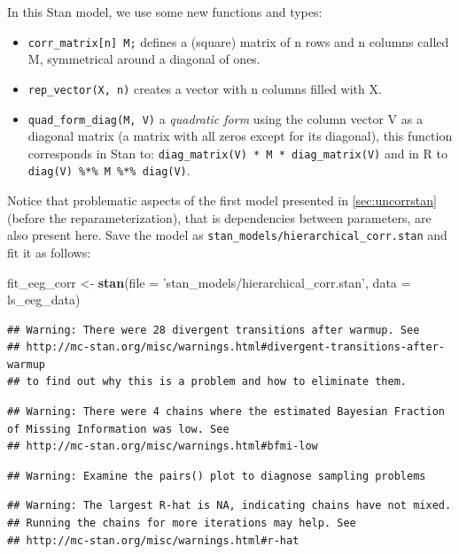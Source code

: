 \documentclass[12pt,]{krantz}
\newenvironment{Shaded}{\begin{snugshade}}{\end{snugshade}}
\newcommand{\DataTypeTok}[1]{\textcolor[rgb]{0.13,0.29,0.53}{#1}}
\newcommand{\KeywordTok}[1]{\textcolor[rgb]{0.13,0.29,0.53}{\textbf{#1}}}
\newcommand{\NormalTok}[1]{#1}
\newcommand{\StringTok}[1]{\textcolor[rgb]{0.31,0.60,0.02}{#1}}
\providecommand{\tightlist}{%
  \setlength{\itemsep}{0pt}\setlength{\parskip}{0pt}}
\theoremstyle{definition}
\theoremstyle{definition}
\theoremstyle{definition}
\theoremstyle{remark}
\begin{document}
In this Stan model, we use some new functions and types:

\begin{itemize}
\tightlist
\item
  \texttt{corr\_matrix{[}n{]}\ M;} defines a (square) matrix of n rows and n columns called M, symmetrical around a diagonal of ones.
\item
  \texttt{rep\_vector(X,\ n)} creates a vector with n columns filled with X.
\item
  \texttt{quad\_form\_diag(M,\ V)} a \emph{quadratic form} using the column vector V as a diagonal matrix (a matrix with all zeros except for its diagonal), this function corresponds in Stan to: \texttt{diag\_matrix(V)\ *\ M\ *\ diag\_matrix(V)} and in R to \texttt{diag(V)\ \%*\%\ M\ \%*\%\ diag(V)}.
\end{itemize}

Notice that problematic aspects of the first model presented in \ref{sec:uncorrstan} (before the reparameterization), that is dependencies between parameters, are also present here. Save the model as \texttt{stan\_models/hierarchical\_corr.stan} and fit it as follows:

\begin{Shaded}
\begin{Highlighting}[]
\NormalTok{fit_eeg_corr <-}\StringTok{ }\KeywordTok{stan}\NormalTok{(}\DataTypeTok{file =} \StringTok{'stan_models/hierarchical_corr.stan'}\NormalTok{, }
                 \DataTypeTok{data =}\NormalTok{ ls_eeg_data)}
\end{Highlighting}
\end{Shaded}

\begin{verbatim}
## Warning: There were 28 divergent transitions after warmup. See
## http://mc-stan.org/misc/warnings.html#divergent-transitions-after-warmup
## to find out why this is a problem and how to eliminate them.
\end{verbatim}

\begin{verbatim}
## Warning: There were 4 chains where the estimated Bayesian Fraction of Missing Information was low. See
## http://mc-stan.org/misc/warnings.html#bfmi-low
\end{verbatim}

\begin{verbatim}
## Warning: Examine the pairs() plot to diagnose sampling problems
\end{verbatim}

\begin{verbatim}
## Warning: The largest R-hat is NA, indicating chains have not mixed.
## Running the chains for more iterations may help. See
## http://mc-stan.org/misc/warnings.html#r-hat
\end{verbatim}
\end{document}
